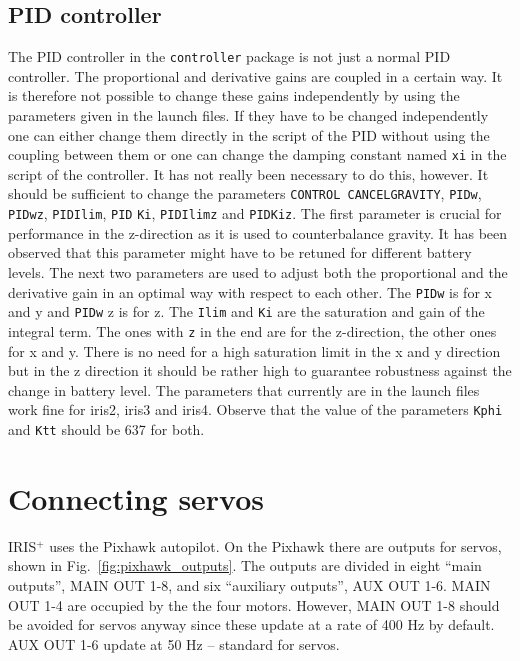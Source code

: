 \documentclass[titlepage,11pt,a4paper]{article}
\begin{document}
\subsection{PID controller}
\label{subsec:pid}
The PID controller in the \texttt{controller} package is not just a
normal PID controller. The proportional and derivative gains are
coupled in a certain way. It is therefore not possible to change these
gains independently by using the parameters given in the launch
files. If they have to be changed independently one can either change
them directly in the script of the PID without using the coupling
between them or one can change the damping constant named
\texttt{x\textunderscore i} in the script of the controller. It has
not really been necessary to do this, however.  It should be
sufficient to change the parameters \texttt{CONTROL\textunderscore
  CANCEL\textunderscore GRAVITY}, \texttt{PID\textunderscore w},
\texttt{PID\textunderscore w\textunderscore z},
\texttt{PID\textunderscore I\textunderscore lim},
\texttt{PID\textunderscore} \texttt{K\textunderscore i},
\texttt{PID\textunderscore I\textunderscore lim\textunderscore z} and
\texttt{PID\textunderscore K\textunderscore i\textunderscore z}. The
first parameter is crucial for performance in the z-direction as it is
used to counterbalance gravity. It has been observed that this
parameter might have to be retuned for different battery levels. The
next two parameters are used to adjust both the proportional and the
derivative gain in an optimal way with respect to each other. The
\texttt{PID\textunderscore w} is for x and y and
\texttt{PID\textunderscore w\textunderscore} z is for z. The
\texttt{I\textunderscore lim} and \texttt{K\textunderscore i} are the
saturation and gain of the integral term. The ones with
\texttt{\textunderscore z} in the end are for the z-direction, the
other ones for x and y. There is no need for a high saturation limit
in the x and y direction but in the z direction it should be rather
high to guarantee robustness against the change in battery level. The
parameters that currently are in the launch files work fine for iris2,
iris3 and iris4.  Observe that the value of the parameters
\texttt{Kphi} and \texttt{Ktt} should be 637 for both.


\section{Connecting servos}
\label{sec:servos}
IRIS$^+$ uses the Pixhawk autopilot. On the Pixhawk there are outputs
for servos, shown in Fig.~\ref{fig:pixhawk_outputs}. The outputs are
divided in eight ``main outputs'', MAIN OUT 1-8, and six ``auxiliary
outputs'', AUX OUT 1-6. MAIN OUT 1-4 are occupied by the the four
motors. However, MAIN OUT 1-8 should be avoided for servos anyway
since these update at a rate of 400 Hz by default. AUX OUT 1-6 update
at 50 Hz -- standard for servos.
\end{document}
